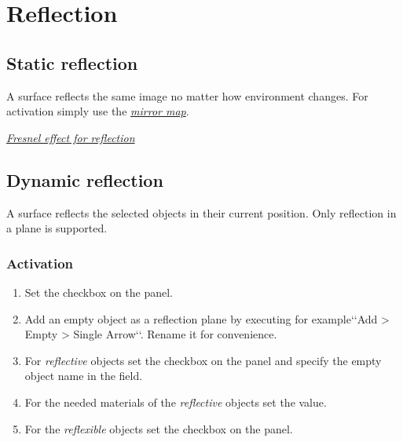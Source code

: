 \documentclass[a4paper,12pt,oneside]{sphinxmanual}
\begin{document}

\section{Reflection}
\label{materials:id6}\label{materials:index-5}\label{materials:material-mirror}

\subsection{Static reflection}
\label{materials:id7}\label{materials:index-6}\label{materials:reflection-static}
A surface reflects the same image no matter how environment changes. For activation simply use the {\hyperref[textures:mirror-map]{\emph{mirror map}}}.




{\hyperref[materials:fresnel]{\emph{Fresnel effect for reflection}}}




\subsection{Dynamic reflection}
\label{materials:index-7}\label{materials:id8}
A surface reflects the selected objects in their current position. Only reflection in a plane is supported.


\subsubsection{Activation}
\label{materials:id9}\begin{enumerate}
\item {} 
Set the  checkbox on the  panel.

\item {} 
Add an empty object as a reflection plane by executing for example{}`{}`Add \textgreater{} Empty \textgreater{} Single Arrow{}`{}`. Rename it for convenience.

\item {} 
For \emph{reflective} objects set the  checkbox on the  panel and specify the empty object name in the  field.

\item {} 
For the needed materials of the \emph{reflective} objects set the  value.

\item {} 
For the \emph{reflexible} objects set the checkbox  on the  panel.

\end{enumerate}
\end{document}
